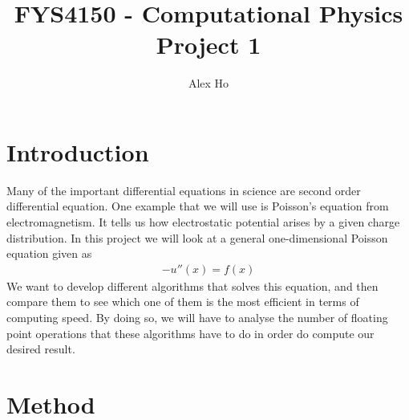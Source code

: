 \documentclass[12pt]{article}
\author{Alex Ho}
\title{FYS4150 - Computational Physics \\ Project 1}
\begin{document}
\maketitle
\section{Introduction}
Many of the important differential equations in science are second order differential equation. One example that we will use is Poisson's equation from electromagnetism. It tells us how electrostatic potential arises by a given charge distribution. In this project we will look at a general one-dimensional Poisson equation given as
\begin{align}
-u''(x) = f(x)
\end{align}
We want to develop different algorithms that solves this equation, and then compare them to see which one of them is the most efficient in terms of computing speed. By doing so, we will have to analyse the number of floating point operations that these algorithms have to do in order do compute our desired result.


\section{Method}
\end{document}
